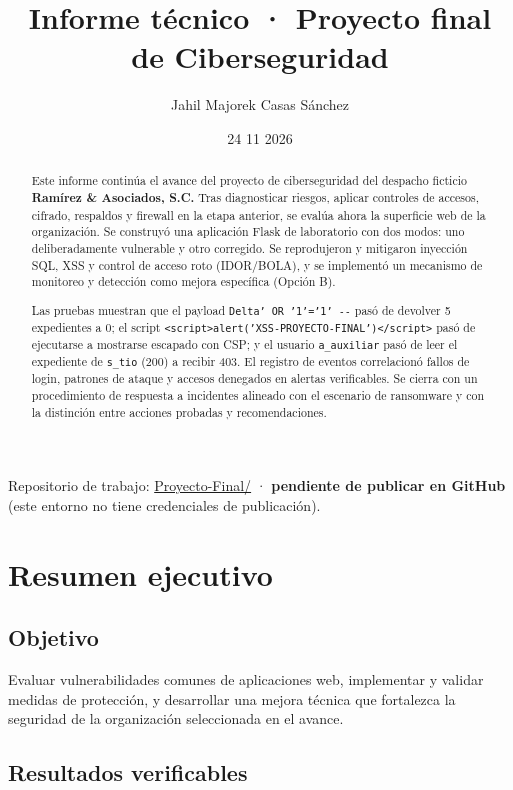 \documentclass[letterpaper]{article}
\author{Jahil Majorek Casas Sánchez}
\date{24 11 2026}
\title{Informe técnico · Proyecto final de Ciberseguridad}
\begin{document}
\maketitle
\tableofcontents

Repositorio de trabajo: \href{README.org}{Proyecto-Final/} · \textbf{pendiente de publicar en GitHub} (este entorno no tiene credenciales de publicación).

\begin{abstract}
Este informe continúa el avance del proyecto de ciberseguridad del despacho ficticio
\textbf{Ramírez \& Asociados, S.C.} Tras diagnosticar riesgos, aplicar controles de accesos,
cifrado, respaldos y firewall en la etapa anterior, se evalúa ahora la superficie web
de la organización. Se construyó una aplicación Flask de laboratorio con dos modos:
uno deliberadamente vulnerable y otro corregido. Se reprodujeron y mitigaron
inyección SQL, XSS y control de acceso roto (IDOR/BOLA), y se implementó un mecanismo
de monitoreo y detección como mejora específica (Opción B).

Las pruebas muestran que el payload \texttt{Delta' OR '1'='1' -{}-{}} pasó de devolver 5
expedientes a 0; el script \texttt{<script>alert('XSS-PROYECTO-FINAL')</script>} pasó de
ejecutarse a mostrarse escapado con CSP; y el usuario \texttt{a\_auxiliar} pasó de leer el
expediente de \texttt{s\_tio} (200) a recibir 403. El registro de eventos correlacionó fallos
de login, patrones de ataque y accesos denegados en alertas verificables. Se cierra
con un procedimiento de respuesta a incidentes alineado con el escenario de
ransomware y con la distinción entre acciones probadas y recomendaciones.
\end{abstract}
\section{Resumen ejecutivo}
\label{sec:orgba973b4}

\subsection{Objetivo}
\label{sec:orgb1b6b82}

Evaluar vulnerabilidades comunes de aplicaciones web, implementar y validar medidas
de protección, y desarrollar una mejora técnica que fortalezca la seguridad de la
organización seleccionada en el avance.
\subsection{Resultados verificables}
\label{sec:org0ae8fd8}
\end{document}
